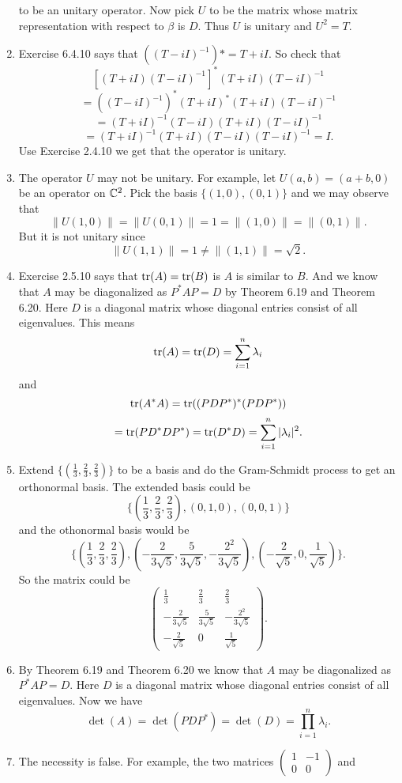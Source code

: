 \begin{enumerate}
to be an unitary operator. Now pick $U$ to be the matrix whose matrix representation with respect to $\beta $ is $D$. Thus $U$ is unitary and $U^2=T$.
\item Exercise 6.4.10 says that $((T-iI)^{-1})*=T+iI$. So check that 
\[[(T+iI)(T-iI)^{-1}]^*(T+iI)(T-iI)^{-1}\]
\[=((T-iI)^{-1})^*(T+iI)^*(T+iI)(T-iI)^{-1}\]
\[=(T+iI)^{-1}(T-iI)(T+iI)(T-iI)^{-1}\]
\[=(T+iI)^{-1}(T+iI)(T-iI)(T-iI)^{-1}=I.\]
Use Exercise 2.4.10 we get that the operator is unitary.
\item The operator $U$ may not be unitary. For example, let $U(a,b)=(a+b,0)$ be an operator on $\mathbb{C}^2$. Pick the basis $\{(1,0),(0,1)\}$ and we may observe that 
\[\|U(1,0)\|=\|U(0,1)\|=1=\|(1,0)\|=\|(0,1)\|.\]
But it is not unitary since 
\[\|U(1,1)\|=1\neq \|(1,1)\|=\sqrt{2}.\]
\item Exercise 2.5.10 says that $\operatorname{tr}(A)=\operatorname{tr}(B)$ is $A$ is similar to $B$. And we know that $A$ may be diagonalized as $P^*AP=D$ by Theorem 6.19 and Theorem 6.20. Here $D$ is a diagonal matrix whose diagonal entries consist of all eigenvalues. This means 
\[\operatorname{tr}(A)=\operatorname{tr}(D)=\sum_{i=1}^n{\lambda_i}\]
and 
\[\operatorname{tr}(A^*A)=\operatorname{tr}((PDP^*)^*(PDP^*))\]
\[=\operatorname{tr}(PD^*DP^*)=\operatorname{tr}(D^*D)=\sum_{i=1}^n{|\lambda_i|^2}.\]
\item Extend $\{(\frac{1}{3},\frac{2}{3},\frac{2}{3})\}$ to be a basis and do the Gram-Schmidt process to get an orthonormal basis. The extended basis could be 
\[\{(\frac{1}{3},\frac{2}{3},\frac{2}{3}),(0,1,0),(0,0,1)\}\]
and the othonormal basis would be 
\[\{(\frac{1}{3},\frac{2}{3},\frac{2}{3}),(-\frac{2}{3\sqrt{5}},\frac{5}{3\sqrt{5}},-\frac{{2}^{2}}{3\sqrt{5}}),(-\frac{2}{\sqrt{5}},0,\frac{1}{\sqrt{5}})\}.\]
So the matrix could be 
\[\begin{pmatrix}\frac{1}{3}&\frac{2}{3}&\frac{2}{3}\\-\frac{2}{3\sqrt{5}}&\frac{5}{3\sqrt{5}}&-\frac{{2}^{2}}{3\sqrt{5}}\\-\frac{2}{\sqrt{5}}&0&\frac{1}{\sqrt{5}}\end{pmatrix}.\]
\item By Theorem 6.19 and Theorem 6.20 we know that $A$ may be diagonalized as $P^*AP=D$. Here $D$ is a diagonal matrix whose diagonal entries consist of all eigenvalues. Now we have 
\[\det(A)=\det(PDP^*)=\det(D)=\prod_{i=1}^n{\lambda_i}.\]
\item The necessity is false. For example, the two matrices $\begin{pmatrix}1&-1\\0&0\end{pmatrix}$ and 

\end{enumerate}
